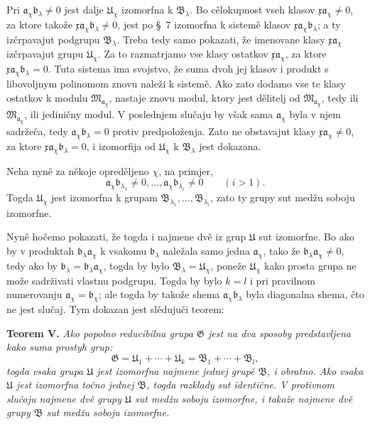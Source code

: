 \documentclass[11pt]{article}
\providecommand{\mM}{\mathfrak M}
\providecommand{\mG}{\mathfrak G}
\providecommand{\mU}{\mathfrak U}
\providecommand{\mB}{\mathfrak B}
\providecommand{\ma}{\mathfrak a}
\providecommand{\mb}{\mathfrak b}
\providecommand{\mx}{\mathfrak x}
\begin{document}
Pri \(\ma_\chi\mb_\lambda\ne0\) jest dalje \(\mU_\chi\) izomorfna k \(\mB_\lambda\). Bo cělokupnost vseh klasov \(\mx\ma_\chi\ne0\), za ktore takože \(\mx\ma_\chi\mb_\lambda\ne0\), jest po \S~7 izomorfna k sistemě klasov \(\mx\ma_\chi\mb_\lambda\); a ty izčrpavajut podgrupu \(\mB_\lambda\). Treba tedy samo pokazati, že imenovane klasy \(\mx\ma_\chi\) izčrpavajut grupu \(\mU_\chi\). Za to razmatrjamo vse klasy ostatkov \(\mx\ma_\chi\), za ktore \(\mx\ma_\chi\mb_\lambda=0\). Tuta sistema ima svojstvo, že suma dvoh jej klasov i produkt s libovoljnym polinomom znovu naleži k sistemě. Ako zato dodamo vse te klasy ostatkov k modulu \(\mM_{\ma_\chi}\), nastaje znovu modul, ktory jest dělitelj od \(\mM_{\ma_\chi}\), tedy ili \(\mM_{\ma_\chi}\), ili jediničny modul. V poslednjem slučaju by však sama \(\ma_\chi\) byla v njem sadržeča, tedy \(\ma_\chi\mb_\lambda=0\) protiv predpoloženja. Zato ne obstavajut klasy \(\mx\ma_\chi\ne0\), za ktore \(\mx\ma_\chi\mb_\lambda=0\), i izomorfija od \(\mU_\chi\) k \(\mB_\lambda\) jest dokazana.

Neha nyně za někoje opreděljeno \(\chi\), na primjer,
\[
 \ma_\chi\mb_{\lambda_1}\ne0,
 \ldots,\ma_\chi\mb_{\lambda_i}\ne0\qquad(i>1).
\]
Togda \(\mU_\chi\) jest izomorfna k grupam \(\mB_{\lambda_1},\ldots,\mB_{\lambda_i}\), zato ty grupy sut medžu soboju izomorfne.

Nyně hočemo pokazati, že togda i najmene dvě iz grup \(\mU\) sut izomorfne. Bo ako by v produktah \(\mb_\lambda\ma_\chi\) k vsakomu \(\mb_\lambda\) naležala samo jedna \(\ma_\chi\), tako že \(\mb_\lambda\ma_\chi\ne0\), tedy ako by \(\mb_\lambda=\mb_\lambda\ma_\chi\), togda by bylo \(\mB_\lambda=\mU_\chi\), poneže \(\mU_\chi\) kako prosta grupa ne može sadrživati vlastnu podgrupu. Togda by bylo \(k=l\) i pri pravilnom numerovanju \(\ma_\chi=\mb_\chi\); ale togda by takože shema \(\ma_\chi\mb_\lambda\) byla diagonalna shema, čto ne jest slučaj. Tym dokazan jest slědujuči teorem:

\textbf{Teorem V.} \textit{Ako popolno reducibilna grupa \(\mG\) jest na dva sposoby predstavljena kako suma prostyh grup:
\[
 \mG=\mU_1+\cdots+\mU_k=\mB_1+\cdots+\mB_l,
\]
togda vsaka grupa \(\mU\) jest izomorfna najmene jednej grupě \(\mB\), i obratno. Ako vsaka \(\mU\) jest izomorfna točno jednej \(\mB\), togda razklady sut identične. V protivnom slučaju najmene dvě grupy \(\mU\) sut medžu soboju izomorfne, i takože najmene dvě grupy \(\mB\) sut medžu soboju izomorfne.}
\end{document}
